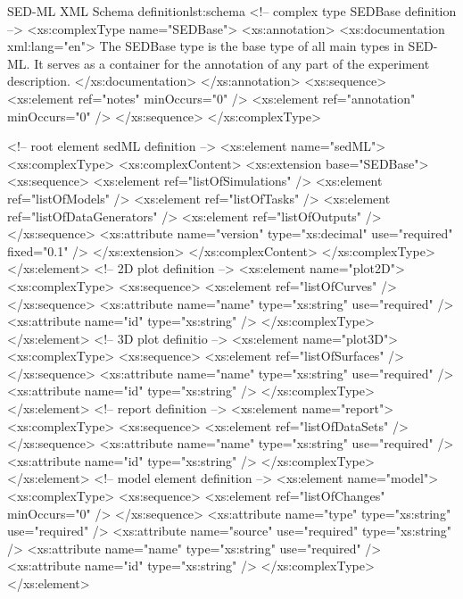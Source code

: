 \begin{myXmlLst}{SED-ML XML Schema definition}{lst:schema}
<!-- complex type SEDBase definition -->
<xs:complexType name="SEDBase">
 <xs:annotation>
  <xs:documentation xml:lang="en">
   The SEDBase type is the base type of all main types in SED-ML. It serves as a container for the annotation of any part of the experiment description.
  </xs:documentation>
 </xs:annotation>
 <xs:sequence>
  <xs:element ref="notes" minOccurs="0" />
  <xs:element ref="annotation" minOccurs="0" />
 </xs:sequence>
</xs:complexType>

<!-- root element sedML definition -->
<xs:element name="sedML">
 <xs:complexType>
  <xs:complexContent>
   <xs:extension base="SEDBase">
    <xs:sequence>
     <xs:element ref="listOfSimulations" />
     <xs:element ref="listOfModels" />
     <xs:element ref="listOfTasks" />
     <xs:element ref="listOfDataGenerators" />
     <xs:element ref="listOfOutputs" />
    </xs:sequence>
    <xs:attribute name="version" type="xs:decimal" use="required" fixed="0.1" />
   </xs:extension>
  </xs:complexContent>
 </xs:complexType>
</xs:element>
<!-- 2D plot definition -->
<xs:element name="plot2D">
 <xs:complexType>
  <xs:sequence>
   <xs:element ref="listOfCurves" />
  </xs:sequence>
  <xs:attribute name="name" type="xs:string" use="required" />
  <xs:attribute name="id" type="xs:string" />
 </xs:complexType>
</xs:element>
<!-- 3D plot definitio -->
<xs:element name="plot3D">
 <xs:complexType>
  <xs:sequence>
   <xs:element ref="listOfSurfaces" />
  </xs:sequence>
  <xs:attribute name="name" type="xs:string" use="required" />
  <xs:attribute name="id" type="xs:string" />
 </xs:complexType>
</xs:element>
<!-- report definition -->
<xs:element name="report">
 <xs:complexType>
  <xs:sequence>
   <xs:element ref="listOfDataSets" />
  </xs:sequence>
  <xs:attribute name="name" type="xs:string" use="required" />
  <xs:attribute name="id" type="xs:string" />
 </xs:complexType>
</xs:element>
<!-- model element definition -->
<xs:element name="model">
 <xs:complexType>
  <xs:sequence>
   <xs:element ref="listOfChanges" minOccurs="0" />
  </xs:sequence>
  <xs:attribute name="type" type="xs:string" use="required" />
  <xs:attribute name="source" use="required" type="xs:string" />
  <xs:attribute name="name" type="xs:string" use="required" />
  <xs:attribute name="id" type="xs:string" />
 </xs:complexType>
</xs:element>


\end{myXmlLst}

